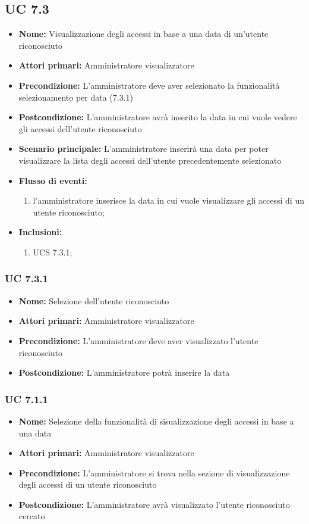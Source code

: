 \subsection{UC 7.3}%
\begin{itemize}
	\item \textbf{Nome:} Visualizzazione degli accessi in base a una data di un'utente riconosciuto
	\item \textbf{Attori primari:} Amministratore visualizzatore
	\item \textbf{Precondizione:} L'amministratore deve aver selezionato la funzionalità selezionamento per data (7.3.1)
	\item \textbf{Postcondizione:} L'amministratore avrà inserito la data in cui vuole vedere gli accessi dell'utente riconosciuto
	\item \textbf{Scenario principale:} L'amministratore inserirà una data per poter visualizzare la lista degli accessi dell'utente precedentemente selezionato
	\item \textbf{Flusso di eventi:} 
	\begin{enumerate}
		\item l'amministratore inserisce la data in cui vuole visualizzare gli accessi di un utente riconosciuto;
	\end{enumerate}
	\item \textbf{Inclusioni:}
	\begin{enumerate}
		\item UCS 7.3.1;
	\end{enumerate}
\end{itemize}

\subsubsection{UC 7.3.1}%
\begin{itemize}
\item \textbf{Nome:} Selezione dell'utente riconosciuto
\item \textbf{Attori primari:} Amministratore visualizzatore
\item \textbf{Precondizione:} L'amministratore deve aver visualizzato l'utente riconosciuto 
\item \textbf{Postcondizione:} L'amministratore potrà inserire la data
\end{itemize}

\subsubsection{UC 7.1.1}%
\begin{itemize}
	\item \textbf{Nome:} Selezione della funzionalità di sisualizzazione degli accessi in base a una data 
	\item \textbf{Attori primari:} Amministratore visualizzatore
	\item \textbf{Precondizione:} L'amministratore si trova nella sezione di visualizzazione degli accessi di un utente riconosciuto
	\item \textbf{Postcondizione:} L'amministratore avrà visualizzato l'utente riconosciuto cercato
\end{itemize}


